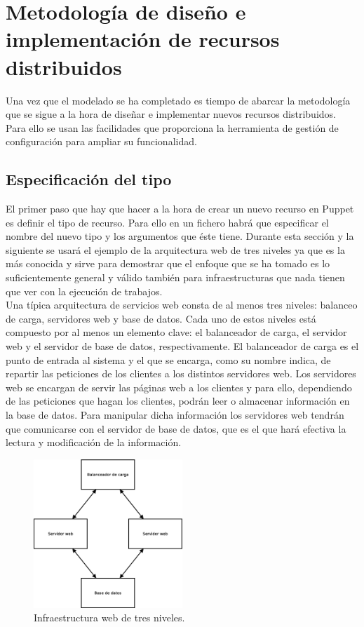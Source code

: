 \chapter{Metodología de diseño e implementación de recursos distribuidos}
\label{cap:metodologia}

Una vez que el modelado se ha completado es tiempo de abarcar la metodología que se sigue a la hora de diseñar e implementar nuevos recursos distribuidos. Para ello se usan las facilidades que proporciona la herramienta de gestión de configuración para ampliar su funcionalidad.


\section{Especificación del tipo}

El primer paso que hay que hacer a la hora de crear un nuevo recurso en Puppet es definir el tipo de recurso. Para ello en un fichero habrá que especificar el nombre del nuevo tipo y los argumentos que éste tiene. Durante esta sección y la siguiente se usará el ejemplo de la arquitectura web de tres niveles ya que es la más conocida y sirve para demostrar que el enfoque que se ha tomado es lo suficientemente general y válido también para infraestructuras que nada tienen que ver con la ejecución de trabajos. \\

Una típica arquitectura de servicios web consta de al menos tres niveles: balanceo de carga, servidores web y base de datos. Cada uno de estos niveles está compuesto por al menos un elemento clave: el balanceador de carga, el servidor web y el servidor de base de datos, respectivamente. El balanceador de carga es el punto de entrada al sistema y el que se encarga, como su nombre indica, de repartir las peticiones de los clientes a los distintos servidores web. Los servidores web se encargan de servir las páginas web a los clientes y para ello, dependiendo de las peticiones que hagan los clientes, podrán leer o almacenar información en la base de datos. Para manipular dicha información los servidores web tendrán que comunicarse con el servidor de base de datos, que es el que hará efectiva la lectura y modificación de la información.\\

\begin{figure} [!htbp]
  \centering
  \includegraphics[width=0.5\textwidth]{figuras/Arquitectura_Web2.eps}
  \caption{Infraestructura web de tres niveles.}
\label{figure:arquitectura-web}
\end{figure}

